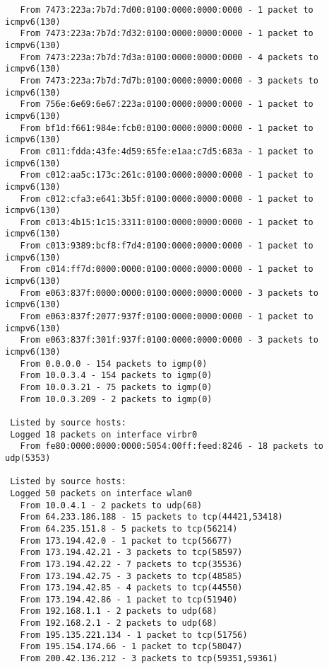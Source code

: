 \begin{lstlisting}
   From 7473:223a:7b7d:7d00:0100:0000:0000:0000 - 1 packet to icmpv6(130)
   From 7473:223a:7b7d:7d32:0100:0000:0000:0000 - 1 packet to icmpv6(130)
   From 7473:223a:7b7d:7d3a:0100:0000:0000:0000 - 4 packets to icmpv6(130)
   From 7473:223a:7b7d:7d7b:0100:0000:0000:0000 - 3 packets to icmpv6(130)
   From 756e:6e69:6e67:223a:0100:0000:0000:0000 - 1 packet to icmpv6(130)
   From bf1d:f661:984e:fcb0:0100:0000:0000:0000 - 1 packet to icmpv6(130)
   From c011:fdda:43fe:4d59:65fe:e1aa:c7d5:683a - 1 packet to icmpv6(130)
   From c012:aa5c:173c:261c:0100:0000:0000:0000 - 1 packet to icmpv6(130)
   From c012:cfa3:e641:3b5f:0100:0000:0000:0000 - 1 packet to icmpv6(130)
   From c013:4b15:1c15:3311:0100:0000:0000:0000 - 1 packet to icmpv6(130)
   From c013:9389:bcf8:f7d4:0100:0000:0000:0000 - 1 packet to icmpv6(130)
   From c014:ff7d:0000:0000:0100:0000:0000:0000 - 1 packet to icmpv6(130)
   From e063:837f:0000:0000:0100:0000:0000:0000 - 3 packets to icmpv6(130)
   From e063:837f:2077:937f:0100:0000:0000:0000 - 1 packet to icmpv6(130)
   From e063:837f:301f:937f:0100:0000:0000:0000 - 3 packets to icmpv6(130)
   From 0.0.0.0 - 154 packets to igmp(0)
   From 10.0.3.4 - 154 packets to igmp(0)
   From 10.0.3.21 - 75 packets to igmp(0)
   From 10.0.3.209 - 2 packets to igmp(0)

 Listed by source hosts:
 Logged 18 packets on interface virbr0
   From fe80:0000:0000:0000:5054:00ff:feed:8246 - 18 packets to udp(5353)

 Listed by source hosts:
 Logged 50 packets on interface wlan0
   From 10.0.4.1 - 2 packets to udp(68)
   From 64.233.186.188 - 15 packets to tcp(44421,53418)
   From 64.235.151.8 - 5 packets to tcp(56214)
   From 173.194.42.0 - 1 packet to tcp(56677)
   From 173.194.42.21 - 3 packets to tcp(58597)
   From 173.194.42.22 - 7 packets to tcp(35536)
   From 173.194.42.75 - 3 packets to tcp(48585)
   From 173.194.42.85 - 4 packets to tcp(44550)
   From 173.194.42.86 - 1 packet to tcp(51940)
   From 192.168.1.1 - 2 packets to udp(68)
   From 192.168.2.1 - 2 packets to udp(68)
   From 195.135.221.134 - 1 packet to tcp(51756)
   From 195.154.174.66 - 1 packet to tcp(58047)
   From 200.42.136.212 - 3 packets to tcp(59351,59361)
\end{lstlisting}
